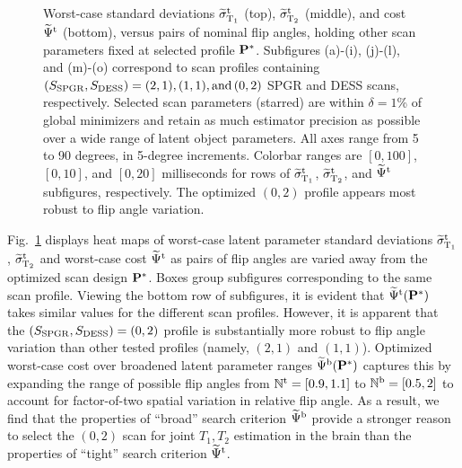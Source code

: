 \begin{sidewaysfigure} [!tbp]
{\begin {minipage} [b] [12.5cm] [b] {0.18\textwidth}
		\end{minipage}	
	}
	\caption{
		Worst-case standard deviations $\widetilde{\sigma}_{\mathrm{T}_1}^\mathrm{t}$ (top), $\widetilde{\sigma}_{\mathrm{T}_2}^\mathrm{t}$ (middle), and cost $\widetilde{\Psi}^{\mathrm{t}}$ (bottom), versus pairs of nominal flip angles, holding other scan parameters fixed at selected profile $\mathbf{P}^*$. 
		Subfigures (a)-(i), (j)-(l), and (m)-(o) correspond to scan profiles containing $(S_{\mathrm{SPGR}}, S_{\mathrm{DESS}}) = (2,1), (1,1), \text{and}\,(0,2)$ SPGR and DESS scans, respectively. 
		Selected scan parameters (starred) are within $\delta = 1$\% of global minimizers and retain as much estimator precision as possible over a wide range of latent object parameters. 		
		All axes range from 5 to 90 degrees, in 5-degree increments. 
		Colorbar ranges are $[0,100]$, $[0,10]$, and $[0,20]$ milliseconds for rows of $\widetilde{\sigma}_{\mathrm{T}_1}^\mathrm{t}$, $\widetilde{\sigma}_{\mathrm{T}_2}^\mathrm{t}$, and $\widetilde{\Psi}^{\mathrm{t}}$ subfigures, respectively. 
		The optimized $(0,2)$ profile appears most robust to flip angle variation.
	}
	\label{fig:heat,maps}
\end{sidewaysfigure}

Fig.~\ref{fig:heat,maps} displays heat maps 
of worst-case latent parameter standard deviations 
$\widetilde{\sigma}_{\mathrm{T}_1}^\mathrm{t}$, $\widetilde{\sigma}_{\mathrm{T}_2}^\mathrm{t}$ 
and worst-case cost $\widetilde{\Psi}^{\mathrm{t}}$ 
as pairs of flip angles are varied away 
from the optimized scan design $\mathbf{P}^*$.
Boxes group subfigures corresponding 
to the same scan profile. 
Viewing the bottom row of subfigures, 
it is evident 
that $\widetilde{\Psi}^{\mathrm{t}}(\mathbf{P}^*)$ takes similar values 
for the different scan profiles. 
However, 
it is apparent that the $(S_{\mathrm{SPGR}},S_{\mathrm{DESS}}) = (0,2)$ profile 
is substantially more robust 
to flip angle variation 
than other tested profiles 
(namely, $(2,1)$ and $(1,1)$). 
Optimized worst-case cost 
over broadened latent parameter ranges 
$\widetilde{\Psi}^{\mathrm{b}}(\mathbf{P}^*)$ captures this 
by expanding the range of possible flip angles 
from $\mathbb{N}^\mathrm{t} = [0.9, 1.1]$ to $\mathbb{N}^\mathrm{b} = [0.5, 2]$ 
to account for factor-of-two spatial variation 
in relative flip angle.
As a result, we find that the properties 
of ``broad'' search criterion $\widetilde{\Psi}^{\mathrm{b}}$ 
provide a stronger reason to select the $(0,2)$ scan 
for joint $T_1, T_2$ estimation in the brain 
than the properties 
of ``tight'' search criterion $\widetilde{\Psi}^{\mathrm{t}}$.

